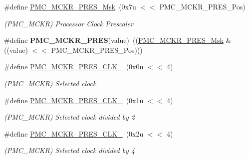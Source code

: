 \begin{DoxyCompactItemize}
\item 
\mbox{\label{group__SAMS70__PMC_gadc14167dbb6ea635a41df3b41c8b9e84}} 
\#define \mbox{\hyperlink{group__SAMS70__PMC_gadc14167dbb6ea635a41df3b41c8b9e84}{P\+M\+C\+\_\+\+M\+C\+K\+R\+\_\+\+P\+R\+E\+S\+\_\+\+Msk}}~(0x7u $<$$<$ P\+M\+C\+\_\+\+M\+C\+K\+R\+\_\+\+P\+R\+E\+S\+\_\+\+Pos)
\begin{DoxyCompactList}\small\item\em (P\+M\+C\+\_\+\+M\+C\+KR) Processor Clock Prescaler \end{DoxyCompactList}\item 
\mbox{\label{group__SAMS70__PMC_ga53c450e13281ee4db86a15880bf31cb8}} 
\#define {\bfseries P\+M\+C\+\_\+\+M\+C\+K\+R\+\_\+\+P\+R\+ES}(value)~((\mbox{\hyperlink{group__SAMV71__PMC_gadc14167dbb6ea635a41df3b41c8b9e84}{P\+M\+C\+\_\+\+M\+C\+K\+R\+\_\+\+P\+R\+E\+S\+\_\+\+Msk}} \& ((value) $<$$<$ P\+M\+C\+\_\+\+M\+C\+K\+R\+\_\+\+P\+R\+E\+S\+\_\+\+Pos)))
\item 
\mbox{\label{group__SAMS70__PMC_ga87c51808043d0df9e79baf64dcd172df}} 
\#define \mbox{\hyperlink{group__SAMS70__PMC_ga87c51808043d0df9e79baf64dcd172df}{P\+M\+C\+\_\+\+M\+C\+K\+R\+\_\+\+P\+R\+E\+S\+\_\+\+C\+L\+K\+\_}}~(0x0u $<$$<$ 4)
\begin{DoxyCompactList}\small\item\em (P\+M\+C\+\_\+\+M\+C\+KR) Selected clock \end{DoxyCompactList}\item 
\mbox{\label{group__SAMS70__PMC_ga1e304039640aaab4c22e5226c0b21f41}} 
\#define \mbox{\hyperlink{group__SAMS70__PMC_ga1e304039640aaab4c22e5226c0b21f41}{P\+M\+C\+\_\+\+M\+C\+K\+R\+\_\+\+P\+R\+E\+S\+\_\+\+C\+L\+K\+\_}}~(0x1u $<$$<$ 4)
\begin{DoxyCompactList}\small\item\em (P\+M\+C\+\_\+\+M\+C\+KR) Selected clock divided by 2 \end{DoxyCompactList}\item 
\mbox{\label{group__SAMS70__PMC_ga0e5f5657a40b36bdb8cf9c194d071b78}} 
\#define \mbox{\hyperlink{group__SAMS70__PMC_ga0e5f5657a40b36bdb8cf9c194d071b78}{P\+M\+C\+\_\+\+M\+C\+K\+R\+\_\+\+P\+R\+E\+S\+\_\+\+C\+L\+K\+\_}}~(0x2u $<$$<$ 4)
\begin{DoxyCompactList}\small\item\em (P\+M\+C\+\_\+\+M\+C\+KR) Selected clock divided by 4 \end{DoxyCompactList}\item 
$$
\end{DoxyCompactItemize}
